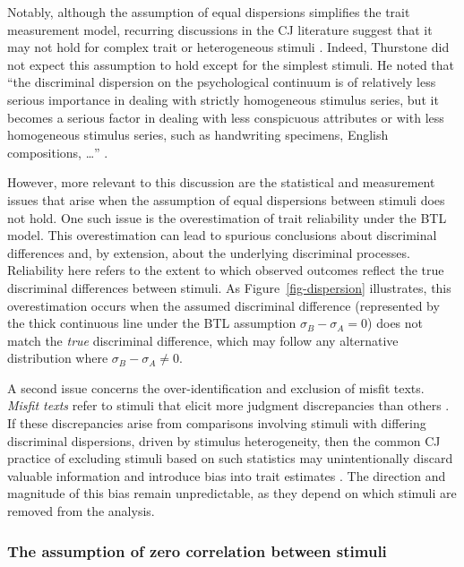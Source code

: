 \documentclass[
  authoryear,
  review,
  1p]{elsarticle}
\begin{document}
Notably, although the assumption of equal dispersions simplifies the
trait measurement model, recurring discussions in the CJ literature
suggest that it may not hold for complex trait or heterogeneous stimuli
\citep{Andrich_1978, Bramley_2008, Kelly_et_al_2022}. Indeed, Thurstone
did not expect this assumption to hold except for the simplest stimuli.
He noted that ``the discriminal dispersion on the psychological
continuum is of relatively less serious importance in dealing with
strictly homogeneous stimulus series, but it becomes a serious factor in
dealing with less conspicuous attributes or with less homogeneous
stimulus series, such as handwriting specimens, English compositions,
\ldots{}'' \citep[pp.~376]{Thurstone_1927a}.

However, more relevant to this discussion are the statistical and
measurement issues that arise when the assumption of equal dispersions
between stimuli does not hold. One such issue is the overestimation of
trait reliability under the BTL model. This overestimation can lead to
spurious conclusions about discriminal differences
\citep{McElreath_2020, Wu_et_al_2022} and, by extension, about the
underlying discriminal processes. Reliability here refers to the extent
to which observed outcomes reflect the true discriminal differences
between stimuli. As Figure~\ref{fig-dispersion} illustrates, this
overestimation occurs when the assumed discriminal difference
(represented by the thick continuous line under the BTL assumption
\(\sigma_{B} - \sigma_{A} = 0\)) does not match the \emph{true}
discriminal difference, which may follow any alternative distribution
where \(\sigma_{B} - \sigma_{A} \neq 0\).

A second issue concerns the over-identification and exclusion of misfit
texts. \emph{Misfit texts} refer to stimuli that elicit more judgment
discrepancies than others
\citep{Pollitt_2004, Pollitt_2012b, Pollitt_2012a, Goossens_et_al_2018}.
If these discrepancies arise from comparisons involving stimuli with
differing discriminal dispersions, driven by stimulus heterogeneity,
then the common CJ practice of excluding stimuli based on such
statistics \citep{Pollitt_2012a, Pollitt_2012b} may unintentionally
discard valuable information \citep{Miller_2023} and introduce bias into
trait estimates \citep{Zimmerman_1994, McElreath_2020}. The direction
and magnitude of this bias remain unpredictable, as they depend on which
stimuli are removed from the analysis.

\subsubsection{The assumption of zero correlation between
stimuli}\label{sec-theory-issue1b}
\end{document}
